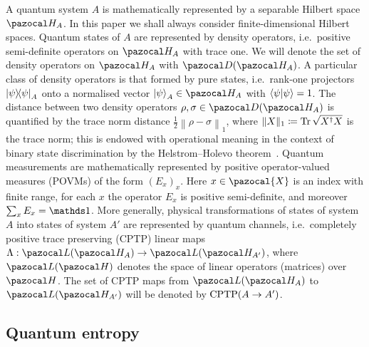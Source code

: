 \documentclass[11pt,notitlepage,tightenlines,nofootinbib,superscriptaddress]{revtex4-1}
\begin{document}
A quantum system $A$ is mathematically represented by a separable Hilbert space $\HH_A$. In this paper we shall always consider finite-dimensional Hilbert spaces. Quantum states of $A$ are represented by density operators, i.e.\ positive semi-definite operators on $\HH_A$ with trace one. We will denote the set of density operators on $\HH_A$ with $\D(\HH_A)$. A particular class of density operators is that formed by pure states, i.e.\ rank-one projectors $\ket{\psi}\!\!\bra{\psi}_A$ onto a normalised vector $\ket{\psi}_A\in \HH_A$ with $\braket{\psi|\psi}=1$. The distance between two density operators $\rho,\sigma\in \D(\HH_A)$ is quantified by the trace norm distance $ \frac12\left\|\rho-\sigma\right\|_1$, where $\|X\|_1\coloneqq \operatorname{Tr} \sqrt{X^\dag X}$ is the trace norm; this is endowed with operational meaning in the context of binary state discrimination by the Helstrom--Holevo theorem~\cite{HELSTROM, Holevo1976}. Quantum measurements are mathematically represented by positive operator-valued measures (POVMs) of the form $(E_x)_x$. Here $x\in \pazocal{X}$ is an index with finite range, for each $x$ the operator $E_x$ is positive semi-definite, and moreover $\sum_x E_x = \id$. More generally, physical transformations of states of system $A$ into states of system $A'$ are represented by quantum channels, i.e.\ completely positive trace preserving (CPTP) linear maps $\Lambda: \LL(\HH_A)\to \LL(\HH_{A'})$, where $\LL(\HH)$ denotes the space of linear operators (matrices) over $\HH$. The set of CPTP maps from $\LL(\HH_A)$ to $\LL(\HH_{A'})$ will be denoted by $\mathrm{CPTP}(A\to A')$.


\subsection{Quantum entropy}\label{sec:entropy}
\end{document}
